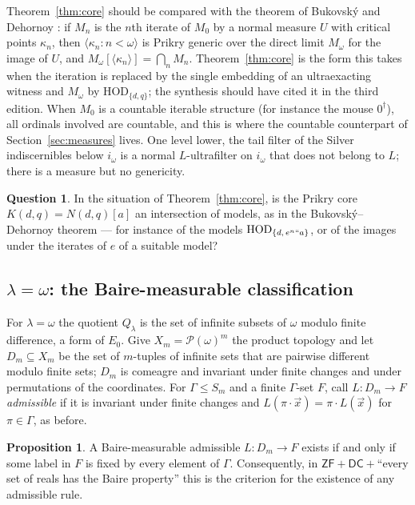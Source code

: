 \documentclass[11pt,letterpaper]{article}
\theoremstyle{definition}
\newtheorem{proposition}[definition]{Proposition}
\newtheorem{question}[definition]{Question}
\numberwithin{equation}{section}
\newcommand{\ZF}{\mathsf{ZF}}
\newcommand{\HOD}{\mathrm{HOD}}
\newcommand{\Pow}{\mathcal P}
\begin{document}
Theorem~\ref{thm:core} should be compared with the theorem of Bukovsk\'y and Dehornoy \cite{bukovsky,dehornoy}: if $M_n$ is the $n$th iterate of $M_0$ by a normal measure $U$ with critical points $\kappa_n$, then $\langle\kappa_n:n<\omega\rangle$ is Prikry generic over the direct limit $M_\omega$ for the image of $U$, and $M_\omega[\langle\kappa_n\rangle]=\bigcap_nM_n$. Theorem~\ref{thm:core} is the form this takes when the iteration is replaced by the single embedding of an ultraexacting witness and $M_\omega$ by $\HOD_{\{d,q\}}$; the synthesis should have cited it in the third edition. When $M_0$ is a countable iterable structure (for instance the mouse $0^\dagger$), all ordinals involved are countable, and this is where the countable counterpart of Section~\ref{sec:measures} lives. One level lower, the tail filter of the Silver indiscernibles below $i_\omega$ is a normal $L$-ultrafilter on $i_\omega$ that does not belong to $L$; there is a measure but no genericity.

\begin{question}
In the situation of Theorem~\ref{thm:core}, is the Prikry core $K(d,q)=N(d,q)[a]$ an intersection of models, as in the Bukovsk\'y--Dehornoy theorem --- for instance of the models $\HOD_{\{d,\,e^n``a\}}$, or of the images under the iterates of $e$ of a suitable model?
\end{question}

\subsection{$\lambda=\omega$: the Baire-measurable classification}

For $\lambda=\omega$ the quotient $Q_\lambda$ is the set of infinite subsets of $\omega$ modulo finite difference, a form of $E_0$. Give $X_m=\Pow(\omega)^m$ the product topology and let $D_m\subseteq X_m$ be the set of $m$-tuples of infinite sets that are pairwise different modulo finite sets; $D_m$ is comeagre and invariant under finite changes and under permutations of the coordinates. For $\Gamma\le S_m$ and a finite $\Gamma$-set $F$, call $L:D_m\to F$ \emph{admissible} if it is invariant under finite changes and $L(\pi\cdot\vec x)=\pi\cdot L(\vec x)$ for $\pi\in\Gamma$, as before.

\begin{proposition}\label{prop:baire}
A Baire-measurable admissible $L:D_m\to F$ exists if and only if some label in $F$ is fixed by every element of $\Gamma$. Consequently, in $\ZF+\mathsf{DC}+{}$``every set of reals has the Baire property'' this is the criterion for the existence of any admissible rule.
\end{proposition}
\end{document}
